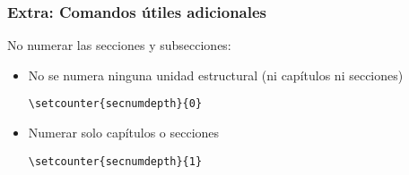 \begin{frame}[fragile]
\frametitle{Extra: Comandos útiles adicionales}
No numerar las secciones y subsecciones:
\begin{itemize}
    \item No se numera ninguna unidad estructural (ni capítulos ni secciones) 
    
    \hspace{0.2cm} \verb|\setcounter{secnumdepth}{0}|
    
    \item Numerar solo capítulos o secciones 
    
    \hspace{0.2cm} \verb|\setcounter{secnumdepth}{1}|
\end{itemize}

\end{frame}